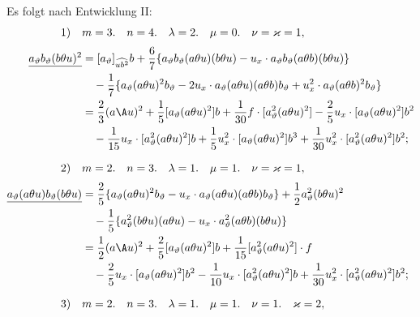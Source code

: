 Es folgt nach Entwicklung II:
\[
\begin{aligned}
\text{1)}\quad&m=3.\quad n=4.\quad \lambda=2.\quad \mu=0.\quad \nu=\varkappa=1,\\[0.25em]
\underline{a_\vartheta b_\vartheta(b\theta u)^2}
&=[a_\vartheta]_{\widehat{ub^2}}b+\frac67\{a_\vartheta b_\vartheta(a\theta u)(b\theta u)-u_x\cdot a_\vartheta b_\vartheta(a\theta b)(b\theta u)\}\\
&\quad-\frac17\{a_\vartheta(a\theta u)^2b_\vartheta-2u_x\cdot a_\vartheta(a\theta u)(a\theta b)b_\vartheta+u_x^2\cdot a_\vartheta(a\theta b)^2b_\vartheta\}\\
&=\frac23(a\A u)^2+\frac15[a_\vartheta(a\theta u)^2]b+\frac1{30}f\cdot[a_\vartheta^2(a\theta u)^2]-\frac25u_x\cdot[a_\vartheta(a\theta u)^2]b^2\\
&\quad-\frac1{15}u_x\cdot[a_\vartheta^2(a\theta u)^2]b+\frac15u_x^2\cdot[a_\vartheta(a\theta u)^2]b^3+\frac1{30}u_x^2\cdot[a_\vartheta^2(a\theta u)^2]b^2;\\[0.7em]
\text{2)}\quad&m=2.\quad n=3.\quad \lambda=1.\quad \mu=1.\quad \nu=\varkappa=1,\\[0.25em]
\underline{a_\vartheta(a\theta u)b_\vartheta(b\theta u)}
&=\frac25\{a_\vartheta(a\theta u)^2b_\vartheta-u_x\cdot a_\vartheta(a\theta u)(a\theta b)b_\vartheta\}+\frac12a_\vartheta^2(b\theta u)^2\\
&\quad-\frac15\{a_\vartheta^2(b\theta u)(a\theta u)-u_x\cdot a_\vartheta^2(a\theta b)(b\theta u)\}\\
&=\frac12(a\A u)^2+\frac25[a_\vartheta(a\theta u)^2]b+\frac1{15}[a_\vartheta^2(a\theta u)^2]\cdot f\\
&\quad-\frac25u_x\cdot[a_\vartheta(a\theta u)^2]b^2-\frac1{10}u_x\cdot[a_\vartheta^2(a\theta u)^2]b+\frac1{30}u_x^2\cdot[a_\vartheta^2(a\theta u)^2]b^2;\\[0.7em]
\text{3)}\quad&m=2.\quad n=3.\quad \lambda=1.\quad \mu=1.\quad \nu=1.\quad \varkappa=2,
\end{aligned}
\]

